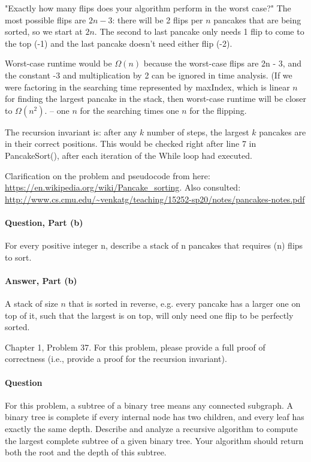 \documentclass{article}
\begin{document}
{"Exactly how many flips does your algorithm perform in the worst case?" The most possible flips are $2n - 3$: there will be 2 flips per $n$ pancakes that are being sorted, so we start at $2n$. The second to last pancake only needs 1 flip to come to the top (-1) and the last pancake doesn't need either flip (-2). 

Worst-case runtime would be $\Omega(n)$ because the worst-case flips are 2n - 3, and the constant -3 and multiplication by 2 can be ignored in time analysis. (If we were factoring in the searching time represented by maxIndex, which is linear $n$ for finding the largest pancake in the stack, then worst-case runtime will be closer to $\Omega(n^2).$ -- one $n$ for the searching times one $n$ for the flipping.

The recursion invariant is: after any $k$ number of steps, the largest $k$ pancakes are in their correct positions. This would be checked right after line 7 in PancakeSort(), after each iteration of the While loop had executed.

Clarification on the problem and pseudocode from here: \url{https://en.wikipedia.org/wiki/Pancake_sorting}. Also consulted: \url{http://www.cs.cmu.edu/~venkatg/teaching/15252-sp20/notes/pancakes-notes.pdf}

\paragraph{Question, Part (b)}{For every positive integer n, describe a stack of n pancakes that requires (n) flips to sort.}
\paragraph{Answer, Part (b)}{A stack of size $n$ that is sorted in reverse, e.g. every pancake has a larger one on top of it, such that the largest is on top, will only need one flip to be perfectly sorted.}

\collab{\todo{}}

Chapter 1, Problem 37.  For this problem, please provide a full proof of
correctness (i.e., provide a proof for the recursion invariant).

\paragraph{Question}{For this problem, a subtree of a binary tree means any connected subgraph. A binary tree is complete if every internal node has two children, and every
leaf has exactly the same depth. Describe and analyze a recursive algorithm
to compute the largest complete subtree of a given binary tree. Your algorithm
should return both the root and the depth of this subtree.}

}
\end{document}
